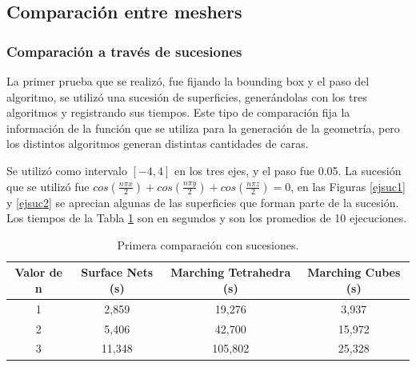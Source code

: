 \documentclass[12pt]{article}
\begin{document}
\subsection{Comparación entre meshers}
\subsubsection{Comparación a través de sucesiones}
La primer prueba que se realizó, fue fijando la bounding box y el paso del algoritmo, se utilizó una sucesión de superficies, generándolas con los tres algoritmos y registrando sus tiempos. Este tipo de comparación fija la información de la función que se utiliza para la generación de la geometría, pero los distintos algoritmos generan distintas cantidades de caras.

Se utilizó como intervalo $[-4,4]$ en los tres ejes, y el paso fue 0.05. La sucesión que se utilizó fue $cos(\frac{n\pi x}{2}) + cos(\frac{n\pi y}{2}) +cos(\frac{n\pi z}{2}) =0$, en las Figuras \ref{ejsuc1} y \ref{ejsuc2} se aprecian algunas de las superficies que forman parte de la sucesión. Los tiempos de la Tabla \ref{suc1} son en segundos y son los promedios de 10 ejecuciones.
\begin{table}[h!]
  \centering
  \begin{tabular}{cccc}
    \toprule
    Valor de n & Surface Nets (s) & Marching Tetrahedra (s) & Marching Cubes (s)\\
    \midrule
    1 & 2,859 & 19,276 & 3,937\\
    2 & 5,406 & 42,700 & 15,972\\
    3 & 11,348 & 105,802 & 25,328\\
    \bottomrule
  \end{tabular}
  \caption{Primera comparación con sucesiones.}
  \label{suc1}
\end{table}
\end{document}
